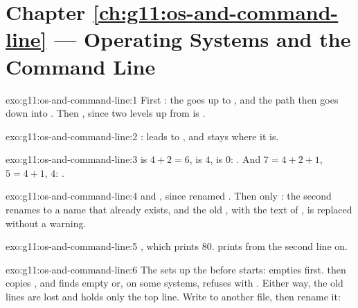 \section*{Chapter \ref{ch:g11:os-and-command-line} --- Operating Systems and the Command Line}

\begin{solution}{exo:g11:os-and-command-line:1}
First : the  goes up to , and the path then goes down
into . Then , since two levels up from  is .
\end{solution}

\begin{solution}{exo:g11:os-and-command-line:2}
:  leads to , and  stays where it is.
\end{solution}

\begin{solution}{exo:g11:os-and-command-line:3}
 is $4 + 2 = 6$,  is $4$, \code{---} is $0$: . And $7 = 4 + 2 + 1$, $5 = 4 + 1$,
$4$: .
\end{solution}

\begin{solution}{exo:g11:os-and-command-line:4}
 and , since  renamed . Then only : the second 
renames  to a name that already exists, and the old , with the text of , is
replaced without a warning.
\end{solution}

\begin{solution}{exo:g11:os-and-command-line:5}
, which prints $80$.  prints from the second line on.
\end{solution}

\begin{solution}{exo:g11:os-and-command-line:6}
The  sets up the  before  starts:  empties  first. 
then copies , and finds  empty or, on some systems, refuses with
. Either way, the old lines are lost and  holds only the top line. Write to another file, then
rename it:

\smallskip\noindent\hspace*{2em}

\noindent\hspace*{2em}
\end{solution}

